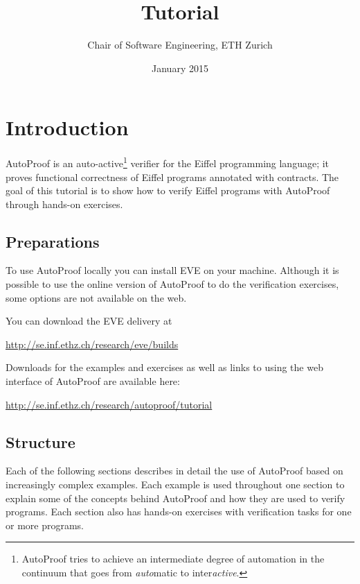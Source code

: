 \documentclass[a4paper,12pt]{article}
\title{\AutoProof Tutorial}
\author{Chair of Software Engineering, ETH Zurich}
\date{January 2015}
\newcommand{\AutoProof}{Auto\-Proof\xspace}
\begin{document}
\maketitle


\section*{Introduction}

\AutoProof is an auto-active\footnote{\AutoProof tries to achieve an intermediate degree of automation in the continuum that goes from \emph{auto}matic to inter\emph{active}.} verifier for the Eiffel programming language; it proves functional correctness of Eiffel programs annotated with contracts. The goal of this tutorial is to show how to verify Eiffel programs with \AutoProof through hands-on exercises.

\subsection*{Preparations}

To use \AutoProof locally you can install EVE on your machine. Although it is possible to use the online version of \AutoProof to do the verification exercises, some options are not available on the web.

You can download the EVE delivery at
\begin{center}
\url{http://se.inf.ethz.ch/research/eve/builds}
\end{center}

Downloads for the examples and exercises as well as links to using the web interface of \AutoProof are available here:
\begin{center}
\url{http://se.inf.ethz.ch/research/autoproof/tutorial}
\end{center}


\subsection*{Structure}

Each of the following sections describes in detail the use of \AutoProof based on increasingly complex examples. Each example is used throughout one section to explain some of the concepts behind \AutoProof and how they are used to verify programs. Each section also has hands-on exercises with verification tasks for one or more programs.
\end{document}
